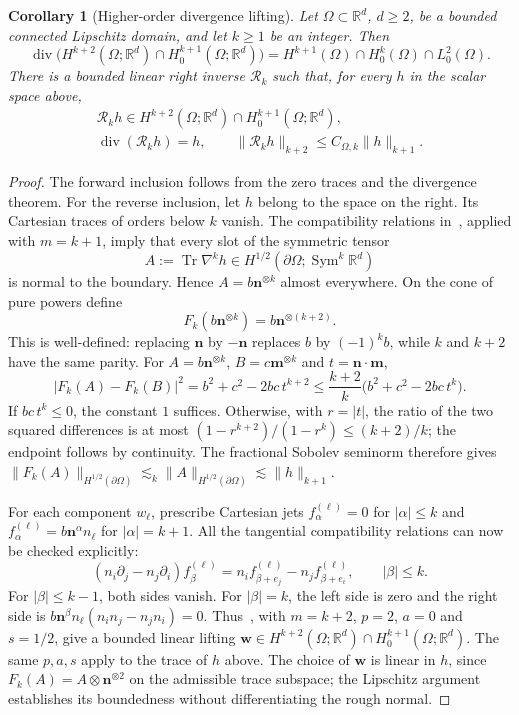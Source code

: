 \documentclass[10pt]{amsart}
\newtheorem{corollary}[theorem]{Corollary}
\renewcommand{\div}{\operatorname{div}}
\numberwithin{equation}{section}
\begin{document}
\begin{corollary}[Higher-order divergence lifting]\label{cor:higher-divergence}
Let $\Omega\subset\mathbb R^d$, $d\geq2$, be a bounded connected Lipschitz domain, and let $k\geq1$ be an integer. Then
\[
\div\big(H^{k+2}(\Omega;\mathbb R^d)\cap H_0^{k+1}(\Omega;\mathbb R^d)\big)
=H^{k+1}(\Omega)\cap H_0^k(\Omega)\cap L_0^2(\Omega).
\]
There is a bounded linear right inverse $\mathcal R_k$ such that, for every $h$ in the scalar space above,
\[
\begin{gathered}
\mathcal R_kh\in H^{k+2}(\Omega;\mathbb R^d)\cap H_0^{k+1}(\Omega;\mathbb R^d),\\
\div(\mathcal R_kh)=h,\qquad
\|\mathcal R_kh\|_{k+2}\leq C_{\Omega,k}\|h\|_{k+1}.
\end{gathered}
\]
\end{corollary}
\begin{proof}
The forward inclusion follows from the zero traces and the divergence theorem. For the reverse inclusion, let $h$ belong to the space on the right. Its Cartesian traces of orders below $k$ vanish. The compatibility relations in~\cite[Proposition~7.7]{MazyaMitreaShaposhnikova2010}, applied with $m=k+1$, imply that every slot of the symmetric tensor
\[
A:=\operatorname{Tr}\nabla^kh\in H^{1/2}(\partial\Omega;\operatorname{Sym}^k\mathbb R^d)
\]
is normal to the boundary. Hence $A=b\boldsymbol n^{\otimes k}$ almost everywhere. On the cone of pure powers define
\[
F_k(b\boldsymbol n^{\otimes k})=b\boldsymbol n^{\otimes(k+2)}.
\]
This is well-defined: replacing $\boldsymbol n$ by $-\boldsymbol n$ replaces $b$ by $(-1)^kb$, while $k$ and $k+2$ have the same parity. For $A=b\boldsymbol n^{\otimes k}$, $B=c\boldsymbol m^{\otimes k}$ and $t=\boldsymbol n\cdot\boldsymbol m$,
\[
|F_k(A)-F_k(B)|^2=b^2+c^2-2bc\,t^{k+2}
\leq\frac{k+2}{k}\bigl(b^2+c^2-2bc\,t^k\bigr).
\]
If $bc\,t^k\leq0$, the constant $1$ suffices. Otherwise, with $r=|t|$, the ratio of the two squared differences is at most
$(1-r^{k+2})/(1-r^k)\leq(k+2)/k$; the endpoint follows by continuity. The fractional Sobolev seminorm therefore gives
$\|F_k(A)\|_{H^{1/2}(\partial\Omega)}\lesssim_k\|A\|_{H^{1/2}(\partial\Omega)}\lesssim\|h\|_{k+1}$.

For each component $w_\ell$, prescribe Cartesian jets $f_\alpha^{(\ell)}=0$ for $|\alpha|\leq k$ and
$f_\alpha^{(\ell)}=b\boldsymbol n^\alpha n_\ell$ for $|\alpha|=k+1$. All the tangential compatibility relations can now be checked explicitly:
\[
(n_i\partial_j-n_j\partial_i)f_\beta^{(\ell)}
=n_i f_{\beta+e_j}^{(\ell)}-n_j f_{\beta+e_i}^{(\ell)},
\qquad |\beta|\leq k.
\]
For $|\beta|\leq k-1$, both sides vanish. For $|\beta|=k$, the left side is zero and the right side is
$b\boldsymbol n^\beta n_\ell(n_i n_j-n_j n_i)=0$.
Thus~\cite[Propositions~7.3, 7.6, 7.7 and Theorem~7.8]{MazyaMitreaShaposhnikova2010}, with $m=k+2$, $p=2$, $a=0$ and $s=1/2$, give a bounded linear lifting
$\boldsymbol w\in H^{k+2}(\Omega;\mathbb R^d)\cap H_0^{k+1}(\Omega;\mathbb R^d)$.
The same $p,a,s$ apply to the trace of $h$ above. The choice of $\boldsymbol w$ is linear in $h$, since $F_k(A)=A\otimes\boldsymbol n^{\otimes2}$ on the admissible trace subspace; the Lipschitz argument establishes its boundedness without differentiating the rough normal.


\end{proof}
\end{document}
